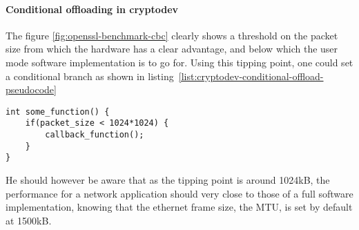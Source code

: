 \paragraph{Conditional offloading in cryptodev}
The figure \ref{fig:openssl-benchmark-cbc} clearly shows a threshold on the packet size from which the hardware has a clear advantage, and below which the user mode software implementation is to go for.
Using this tipping point, one could set a conditional branch as shown in listing~\ref{list:cryptodev-conditional-offload-pseudocode}

\lstset{language=c}
\begin{lstlisting}[caption=cryptodev conditional offloading, label=list:cryptodev-conditional-offload-pseudocode]
int some_function() {
	if(packet_size < 1024*1024) {
		callback_function();
	}
}
\end{lstlisting}

He should however be aware that as the tipping point is around 1024kB, the performance for a network application should very close to those of a full software implementation, knowing that the ethernet frame size, the MTU, is set by default at 1500kB.


